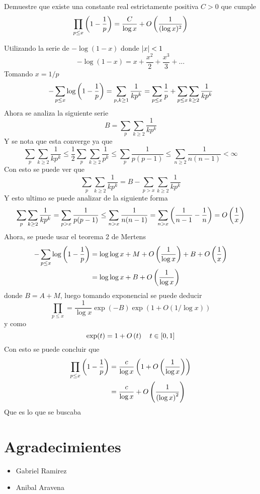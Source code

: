 \begin{prob}[4 pts.]
	Demuestre que existe una constante real estrictamente positiva $C>0$ que cumple
	\[\prod_{p\leq x}\left(1-\frac{1}{p}\right)=\frac{C}{\log x}+O\left(\frac{1}{(\log x)^2}\right)\]
\end{prob}

\begin{sol}
	Utilizando la serie de $-\log (1-x)$ donde $\left|x\right|<1$
	\[-\log (1-x)=x+\frac{x^2}2+\frac{x^3}3+...\]
	Tomando $x=1/p$
	\[-\sum_{p\leq x}\log\left(1-\frac1p\right)=\sum_{p,k\geq1}\frac1{kp^k}=\sum_{p\leq x}\frac1p+\sum_{p\leq x}\sum_{k\geq2}\frac1{kp^k}\]
	Ahora se analiza la siguiente serie
	\[B=\sum_p\sum_{k\geq2}\frac1{kp^k}\]
	Y se nota que esta converge ya que
	\[\sum_p\sum_{k\geq2}\frac1{kp^k}\leq\frac12\sum_p\sum_{k\geq2}\frac1{p^k}\leq\sum_p\frac1{p(p-1)}\leq\sum_{n\geq2}\frac1{n(n-1)}<\infty\]
	Con esto se puede ver que
	\[\sum_p\sum_{k\geq2}\frac1{kp^k}=B-\sum_{p>x}\sum_{k\geq2}\frac1{kp^k}\]
	Y esto ultimo se puede analizar de la siguiente forma
	\[\sum_p\sum_{k\geq2}\frac1{kp^k}=\sum_{p>x}\frac1{p(p-1)}\leq\sum_{n>x}\frac1{n(n-1)}=\sum_{n>x}\left(\frac1{n-1}-\frac1n\right)=O\left(\frac1x\right)\]
	Ahora, se puede usar el teorema 2 de Mertens
	\begin{align*}
		-\sum_{p\leq x}\log\left(1-\frac1p\right) & =\log\log x+M+O\left(\frac1{\log x}\right)+B+O\left(\frac1x\right) \\
		                                     & =\log\log x+B+O\left(\frac1{\log x}\right)
	\end{align*}
	donde $B=A+M$, luego tomando exponencial se puede deducir
	\[\prod_{p\leq x}=\frac1{\log x}\exp(-B)\exp(1+O(1/\log x))\]
	y como
	\[\exp(t)=1+O\left(t\right)\quad t\in[0,1]\]
	Con esto se puede concluir que
	\begin{align*}
		\prod_{p\leq x}\left(1-\frac1p\right) & =\frac{c}{\log x}\left(1+O\left(\frac1{\log x}\right)\right)  \\
		                                 & =\frac{c}{\log x}+O\left(\frac1{\left(\log x\right)^2}\right)
	\end{align*}
	Que es lo que se buscaba\cite{mertens3}
\end{sol}

\section{Agradecimientes}
\begin{multicols}{2}
	\begin{itemize}
		\item Gabriel Ramirez

		\item Anibal Aravena
	\end{itemize}
\end{multicols}




